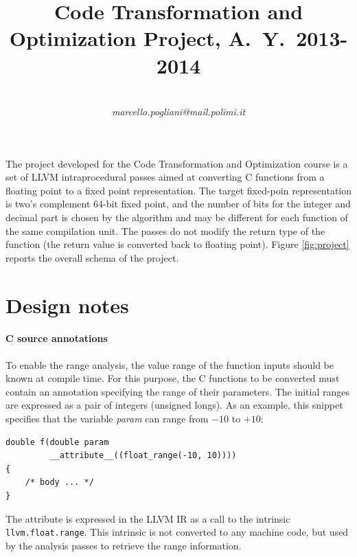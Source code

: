 \documentclass[9pt,twocolumn,a4paper]{scrartcl}
\title{Code Transformation and Optimization Project, A.~Y.~2013-2014}
\author{\realauthor \\[.3em]
        {\normalsize\itshape marcello.pogliani@mail.polimi.it}}
\begin{document}
\maketitle
\thispagestyle{empty}
\pagestyle{empty}

The project developed for the Code Transformation and Optimization course is a
set of LLVM intraprocedural passes aimed at converting C functions from a
floating point to a fixed point representation.
The target fixed-poin representation is two's complement 64-bit fixed point,
and the number of bits for the integer and decimal part is chosen by the
algorithm and may be different for each function of the same compilation unit.
The passes do not modify the return type of the function (the return value is
converted back to floating point).
Figure \ref{fig:project} reports the overall schema of the project.

\section{Design notes}

\paragraph{C source annotations} To enable the range analysis, the value range
of the function inputs should be known at compile time.
For this purpose, the C functions to be converted must contain an annotation
specifying the range of their parameters.
The initial ranges are expressed as a pair of integers (unsigned longs).
As an example, this snippet specifies that the variable \emph{param} can range
from $-10$ to $+10$:
\begin{verbatim}
double f(double param
         __attribute__((float_range(-10, 10))))
{
    /* body ... */
}
\end{verbatim}
The attribute is expressed in the LLVM \ac{IR} as a call to the intrinsic
\verb|llvm.float.range|. This intrinsic is not converted to any machine code,
but used by the analysis passes to retrieve the range information.
\end{document}
